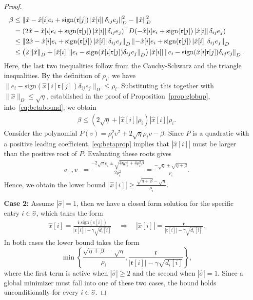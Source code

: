 \documentclass[11pt]{article}
\theoremstyle{plain}
\theoremstyle{definition}
\theoremstyle{plain}
\newcommand{\norm}[1]{\left\lVert#1\right\rVert}
\newcommand{\abs}[1]{\left\lvert#1\right\rvert}
\newcommand{\tpose}[1]{#1^{\top}}
\newcommand{\ccr}{{\mathfrak r}}
\begin{document}
\begin{proof}
\begin{align}
   \notag \beta &\leq \norm{\hat{x}-\hat{x}[i]e_i+\mathrm{sign}(\ccr[j])\abs{\hat{x}[i]}\delta_{ij}e_j}_D^2-\norm{\hat{x}}_D^2\\&\notag=\tpose{(2\hat{x}-\hat{x}[i]e_i+\mathrm{sign}(\ccr[j])\abs{\hat{x}[i]}\delta_{ij}e_j)}D(-\hat{x}[i]e_i+\mathrm{sign}(\ccr[j])\abs{\hat{x}[i]}\delta_{ij}e_j)\\&
    \leq \norm{2\hat{x}-\hat{x}[i]e_i+\mathrm{sign}(\ccr[j])\abs{\hat{x}[i]}\delta_{ij}e_j}_D\norm{-\hat{x}[i]e_i+\mathrm{sign}(\ccr[j])\abs{\hat{x}[i]}\delta_{ij}e_j}_D\\
    &\notag \leq\left(2\norm{\hat{x}}_D+\abs{\hat{x}[i]}\norm{e_i-\mathrm{sign}(\hat{x}[i]\ccr[j])\delta_{ij}e_j}_D\right)\abs{\hat{x}[i]}\norm{e_i-\mathrm{sign}(\hat{x}[i]\ccr[j])\delta_{ij}e_j}_D.
\end{align}
Here, the last two inequalities follow from the Cauchy-Schwarz and the triangle inequalities. By the definition of $\rho_i$, we have $ \|e_i-\mathrm{sign}(\hat{x}[i]\ccr[j])\delta_{ij}e_j\|_D\leq \rho_i$. Substituting this together with $\|\hat x\|_D\leq \sqrt{\eta}$, established in the proof of Proposition~\ref{prop:globup}, into~\eqref{eq:betabound}, we obtain
 \begin{align}
 \label{eq:betaprop}
     \beta\leq (2\sqrt{\eta}+\abs{\hat{x}[i]}\rho_i)\abs{\hat{x}[i]}\rho_i.
 \end{align}
 Consider the polynomial $P(v)= \rho_i^2v^2+2\sqrt{\eta}\rho_i v-\beta$. Since $P$ is a quadratic with a positive leading coefficient, \eqref{eq:betaprop} implies that $|\hat x[i]|$ must be larger than the positive root of $P$. Evaluating these roots gives
 \begin{align*}
     v_+,v_-=\frac{-2\sqrt{\eta}\rho_i\pm\sqrt{4\eta\rho_i^2+4\rho_i^2\beta}}{2\rho_i^2}=\frac{-\sqrt{\eta}\pm\sqrt{\eta+\beta}}{\rho_i}.
 \end{align*}
 Hence, we obtain the lower bound $\abs{\hat{x}[i]}\geq \frac{\sqrt{\eta+\beta}-\sqrt{\eta}}{\rho_i}$.

 \textbf{Case 2: } Assume $\abs{\hat{\sigma}}=1$, then we have a closed form solution for the specific entry $i\in\hat{\sigma}$, which takes the form
\begin{align*}
    \hat{x}[i]=\frac{\bar{\ccr}\;\mathrm{sign}(\ccr[i])}{\abs{\ccr[i]}-\gamma\sqrt{d_i[i]}}\quad\Rightarrow\quad \abs{\hat{x}[i]}=\frac{\bar{\ccr}}{\abs{\ccr[i]}-\gamma\sqrt{d_i[i]}}.
\end{align*}
In both cases the lower bound takes the form
\[
    \min\left\{ \frac{\sqrt{\eta+\beta}-\sqrt{\eta}}{\rho_i},\frac{\bar{\ccr}}{\abs{\ccr[i]}-\gamma\sqrt{d_i[i]}}\right\},
\] where the first term is active when $\abs{\hat{\sigma}}\geq2$ and the second when $\abs{\hat{\sigma}}=1$. Since a global minimizer must fall into one of these two cases, the bound holds unconditionally for every $i\in\hat{\sigma}$.
 \end{proof}
\end{document}
